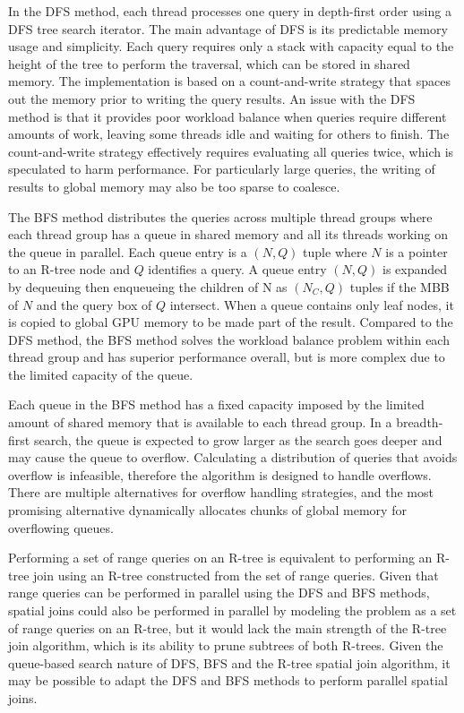 In the DFS method, each thread processes one query in depth-first order using a DFS tree search iterator. The main advantage of DFS is its predictable memory usage and simplicity. Each query requires only a stack with capacity equal to the height of the tree to perform the traversal, which can be stored in shared memory. The implementation is based on a count-and-write strategy that spaces out the memory prior to writing the query results. An issue with the DFS method is that it provides poor workload balance when queries require different amounts of work, leaving some threads idle and waiting for others to finish. The count-and-write strategy effectively requires evaluating all queries twice, which is speculated to harm performance. For particularly large queries, the writing of results to global memory may also be too sparse to coalesce.

The BFS method distributes the queries across multiple thread groups where each thread group has a queue in shared memory and all its threads working on the queue in parallel. Each queue entry is a \((N, Q)\) tuple where \(N\) is a pointer to an R-tree node and \(Q\) identifies a query. A queue entry \((N, Q)\) is expanded by dequeuing then enqueueing the children of N as \((N_C, Q)\) tuples if the MBB of \(N\) and the query box of \(Q\) intersect. When a queue contains only leaf nodes, it is copied to global GPU memory to be made part of the result. Compared to the DFS method, the BFS method solves the workload balance problem within each thread group and has superior performance overall, but is more complex due to the limited capacity of the queue.

Each queue in the BFS method has a fixed capacity imposed by the limited amount of shared memory that is available to each thread group. In a breadth-first search, the queue is expected to grow larger as the search goes deeper and may cause the queue to overflow. Calculating a distribution of queries that avoids overflow is infeasible, therefore the algorithm is designed to handle overflows. There are multiple alternatives for overflow handling strategies, and the most promising alternative dynamically allocates chunks of global memory for overflowing queues.

Performing a set of range queries on an R-tree is equivalent to performing an R-tree join using an R-tree constructed from the set of range queries. Given that range queries can be performed in parallel using the DFS and BFS methods, spatial joins could also be performed in parallel by modeling the problem as a set of range queries on an R-tree, but it would lack the main strength of the R-tree join algorithm, which is its ability to prune subtrees of both R-trees. Given the queue-based search nature of DFS, BFS and the R-tree spatial join algorithm, it may be possible to adapt the DFS and BFS methods to perform parallel spatial joins.

